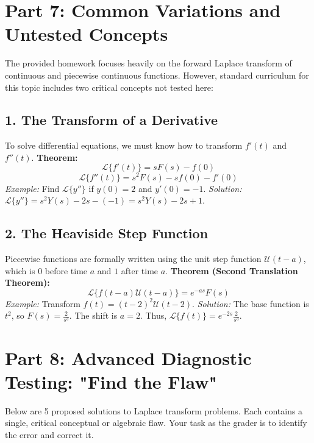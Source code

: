 \documentclass[11pt, a4paper]{article}
\theoremstyle{definition}
\theoremstyle{remark}
\begin{document}
\newpage
\section{Part 7: Common Variations and Untested Concepts}

The provided homework focuses heavily on the forward Laplace transform of continuous and piecewise continuous functions. However, standard curriculum for this topic includes two critical concepts not tested here:

\subsection{1. The Transform of a Derivative}
To solve differential equations, we must know how to transform $f'(t)$ and $f''(t)$.
\textbf{Theorem:} 
\[
\mathscr{L}\{f'(t)\} = sF(s) - f(0)
\]
\[
\mathscr{L}\{f''(t)\} = s^2F(s) - sf(0) - f'(0)
\]
\textit{Example:} Find $\mathscr{L}\{y''\}$ if $y(0)=2$ and $y'(0)=-1$.
\textit{Solution:} $\mathscr{L}\{y''\} = s^2 Y(s) - 2s - (-1) = s^2 Y(s) - 2s + 1$.

\subsection{2. The Heaviside Step Function}
Piecewise functions are formally written using the unit step function $\mathcal{U}(t-a)$, which is $0$ before time $a$ and $1$ after time $a$.
\textbf{Theorem (Second Translation Theorem):}
\[
\mathscr{L}\{f(t-a)\mathcal{U}(t-a)\} = e^{-as} F(s)
\]
\textit{Example:} Transform $f(t) = (t-2)^2 \mathcal{U}(t-2)$.
\textit{Solution:} The base function is $t^2$, so $F(s) = \frac{2}{s^3}$. The shift is $a=2$. Thus, $\mathscr{L}\{f(t)\} = e^{-2s} \frac{2}{s^3}$.

\section{Part 8: Advanced Diagnostic Testing: "Find the Flaw"}

Below are 5 proposed solutions to Laplace transform problems. Each contains a single, critical conceptual or algebraic flaw. Your task as the grader is to identify the error and correct it.
\end{document}
